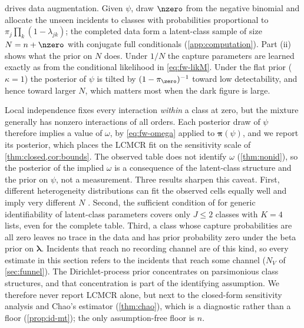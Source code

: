  drives data augmentation. Given $\psi$, draw $\nzero$ from the negative binomial and allocate the unseen incidents to classes with probabilities proportional to $\pi_j\prod_k(1-\lambda_{jk})$; the completed data form a latent-class sample of size $N=n+\nzero$ with conjugate full conditionals (\cref{app:computation}). Part (ii) shows what the prior on $N$ does. Under $1/N$ the capture parameters are learned exactly as from the conditional likelihood in \eqref{eq:fw-likM}. Under the flat prior ($\kappa=1$) the posterior of $\psi$ is tilted by $(1-\pi_{\zero})^{-1}$ toward low detectability, and hence toward larger $N$, which matters most when the dark figure is large.

\begin{remark}\label{rem:models-lc-id}
Local independence fixes every interaction \emph{within} a class at zero, but the mixture generally has nonzero interactions of all orders. Each posterior draw of $\psi$ therefore implies a value of $\omega$, by \eqref{eq:fw-omega} applied to $\bm\pi(\psi)$, and we report its posterior, which places the LCMCR fit on the sensitivity scale of \cref{thm:closed,cor:bounds}. The observed table does not identify $\omega$ (\cref{thm:nonid}), so the posterior of the implied $\omega$ is a consequence of the latent-class structure and the prior on $\psi$, not a measurement. Three results sharpen this caveat. First, different heterogeneity distributions can fit the observed cells equally well and imply very different $N$ \citep{link2003}. Second, the sufficient condition of \citet{allman2009} for generic identifiability of latent-class parameters covers only $J\le2$ classes with $K=4$ lists, even for the complete table. Third, a class whose capture probabilities are all zero leaves no trace in the data and has prior probability zero under the beta prior on $\bm\lambda$. Incidents that reach no recording channel are of this kind, so every estimate in this section refers to the incidents that reach some channel ($N_V$ of \cref{sec:funnel}). The Dirichlet-process prior concentrates on parsimonious class structures, and that concentration is part of the identifying assumption. We therefore never report LCMCR alone, but next to the closed-form sensitivity analysis and Chao's estimator (\cref{thm:chao}), which is a diagnostic rather than a floor (\cref{prop:id-mt}); the only assumption-free floor is $n$.
\end{remark}

